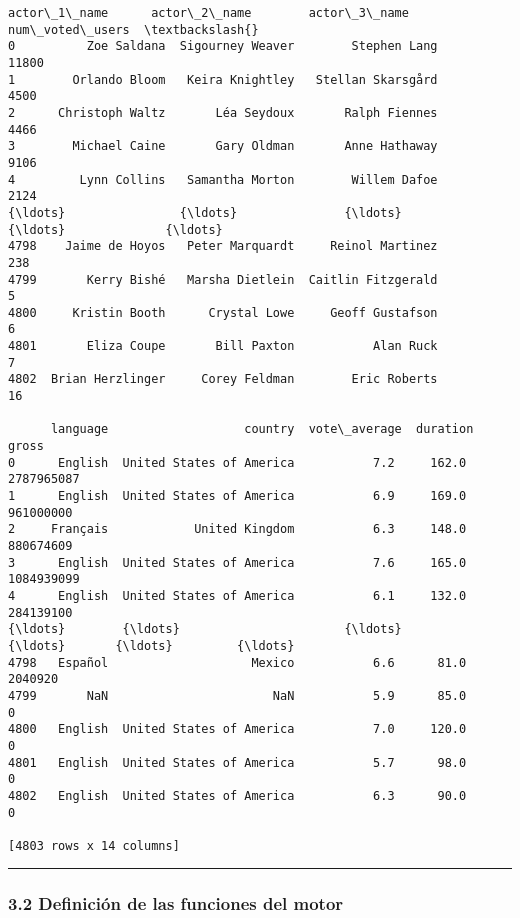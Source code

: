 \begin{tcolorbox}[breakable, size=fbox, boxrule=.5pt, pad at break*=1mm, opacityfill=0]
\begin{Verbatim}[commandchars=\\\{\}]
          actor\_1\_name      actor\_2\_name        actor\_3\_name  num\_voted\_users  \textbackslash{}
0          Zoe Saldana  Sigourney Weaver        Stephen Lang            11800
1        Orlando Bloom   Keira Knightley   Stellan Skarsgård             4500
2      Christoph Waltz       Léa Seydoux       Ralph Fiennes             4466
3        Michael Caine       Gary Oldman       Anne Hathaway             9106
4         Lynn Collins   Samantha Morton        Willem Dafoe             2124
{\ldots}                {\ldots}               {\ldots}                 {\ldots}              {\ldots}
4798    Jaime de Hoyos   Peter Marquardt     Reinol Martinez              238
4799       Kerry Bishé   Marsha Dietlein  Caitlin Fitzgerald                5
4800     Kristin Booth      Crystal Lowe     Geoff Gustafson                6
4801       Eliza Coupe       Bill Paxton           Alan Ruck                7
4802  Brian Herzlinger     Corey Feldman        Eric Roberts               16

      language                   country  vote\_average  duration       gross
0      English  United States of America           7.2     162.0  2787965087
1      English  United States of America           6.9     169.0   961000000
2     Français            United Kingdom           6.3     148.0   880674609
3      English  United States of America           7.6     165.0  1084939099
4      English  United States of America           6.1     132.0   284139100
{\ldots}        {\ldots}                       {\ldots}           {\ldots}       {\ldots}         {\ldots}
4798   Español                    Mexico           6.6      81.0     2040920
4799       NaN                       NaN           5.9      85.0           0
4800   English  United States of America           7.0     120.0           0
4801   English  United States of America           5.7      98.0           0
4802   English  United States of America           6.3      90.0           0

[4803 rows x 14 columns]
\end{Verbatim}
\end{tcolorbox}
        
    \begin{center}\rule{0.5\linewidth}{0.5pt}\end{center}

\hypertarget{definiciuxf3n-de-las-funciones-del-motor}{%
\subsubsection{3.2 Definición de las funciones del
motor}\label{definiciuxf3n-de-las-funciones-del-motor}}


